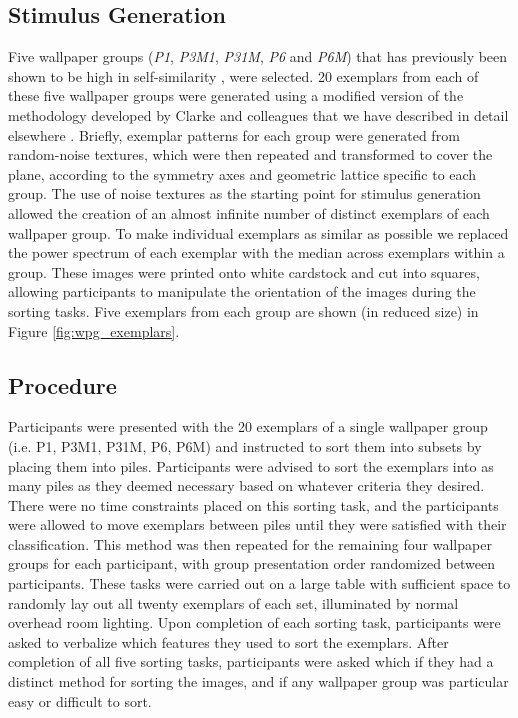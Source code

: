 \documentclass[11pt, twoside]{article}
\begin{document}
\subsection*{Stimulus Generation}
Five wallpaper groups (\textit{P1}, \textit{P3M1}, \textit{P31M}, \textit{P6} and \textit{P6M}) that has previously been shown to be high in self-similarity \citep{RN172}, were selected. 20 exemplars from each of these five wallpaper groups were generated using a modified version of the methodology developed by Clarke and colleagues \citep{RN172} that we have described in detail elsewhere \citep{RN1725}. Briefly, exemplar patterns for each group were generated from random-noise textures, which were then repeated and transformed to cover the plane, according to the symmetry axes and geometric lattice specific to each group. The use of noise textures as the starting point for stimulus generation allowed the creation of an almost infinite number of distinct exemplars of each wallpaper group. To make individual exemplars as similar as possible we replaced the power spectrum of each exemplar with the median across exemplars within a group. These images were printed onto white cardstock and cut into squares, allowing participants to manipulate the orientation of the images during the sorting tasks. Five exemplars from each group are shown (in reduced size) in Figure \ref{fig:wpg_exemplars}. 

\subsection*{Procedure}
Participants were presented with the 20 exemplars of a single wallpaper group (i.e. P1, P3M1, P31M, P6, P6M) and instructed to sort them into subsets by placing them into piles. Participants were advised to sort the exemplars into as many piles as they deemed necessary based on whatever criteria they desired. There were no time constraints placed on this sorting task, and the participants were allowed to move exemplars between piles until they were satisfied with their classification. This method was then repeated for the remaining four wallpaper groups for each participant, with group presentation order randomized between participants. These tasks were carried out on a large table with sufficient space to randomly lay out all twenty exemplars of each set, illuminated by normal overhead room lighting. Upon completion of each sorting task, participants were asked to verbalize which features they used to sort the exemplars. After completion of all five sorting tasks, participants were asked which if they had a distinct method for sorting the images, and if any wallpaper group was particular easy or difficult to sort.
\end{document}
